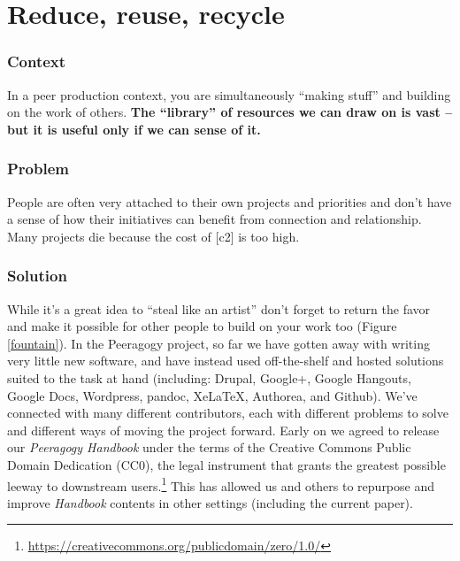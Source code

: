 \section{Reduce, reuse, recycle} \label{sec:Reduce, reuse, recycle}

\subsubsection*{Context}
In a peer production context, you are simultaneously ``making stuff'' and building on the work of others. 
\textbf{The ``library'' of resources we can draw on is vast -- but it is useful only if we can sense of it.}

\subsubsection*{Problem}
People are often very attached to their own projects and priorities and don't have a sense of how their initiatives can benefit from connection and relationship.  Many projects die because the cost of  [c2] is too high.

\subsubsection*{Solution} While it's a great idea to ``steal like an artist'' don't forget to return the favor and make it possible for other people to build on your work too (Figure \ref{fountain}).  In the Peeragogy project, so far we have gotten away with writing very little new software, and have instead used off-the-shelf and hosted solutions suited to the task at hand (including: Drupal, Google+, Google Hangouts, Google Docs, Wordpress, pandoc, XeLaTeX, Authorea, and Github).  We've connected with many different contributors, each with different problems to solve and different ways of moving the project forward.  Early on we agreed to release our \emph{Peeragogy Handbook} under the terms of the Creative Commons Public Domain Dedication (CC0), the legal instrument that grants the greatest possible leeway to downstream users.\footnote{\url{https://creativecommons.org/publicdomain/zero/1.0/}}  This has allowed us and others to repurpose and improve \emph{Handbook} contents in other settings (including the current paper).

